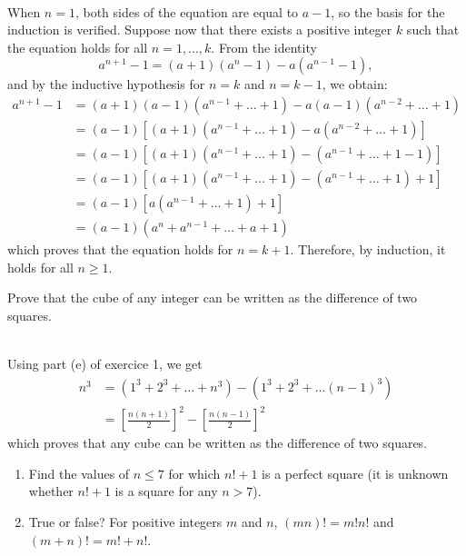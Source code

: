 \begin{solution}
    \\ When $n = 1$, both sides of the equation are equal to $a - 1$, so the basis for the induction is verified. Suppose now that there exists a positive integer $k$ such that the equation holds for all $n = 1, ..., k$. From the identity
    $$a^{n+1} - 1 = (a+1)(a^n - 1) - a(a^{n-1} - 1),$$ 
    and by the inductive hypothesis for $n = k$ and $n = k-1$, we obtain:
    \begin{align*}
        a^{n+1} - 1 &= (a+1)(a-1)(a^{n-1} + \dots + 1) -a(a-1)(a^{n-2} + \dots + 1) \\
        &= (a-1)[(a+1)(a^{n-1} + \dots + 1) -a(a^{n-2} + \dots + 1)] \\
        &= (a-1)[(a+1)(a^{n-1} + \dots + 1) -(a^{n-1} + \dots + 1 - 1)] \\
        &= (a-1)[(a+1)(a^{n-1} + \dots + 1) -(a^{n-1} + \dots + 1) + 1] \\
        &= (a-1)[a(a^{n-1} + \dots + 1) + 1] \\
        &= (a-1)(a^n + a^{n-1} + \dots + a + 1)
    \end{align*}
    which proves that the equation holds for $n = k+1$. Therefore, by induction, it holds for all $n \geq 1$. \\
\end{solution}

\begin{exercise}
    Prove that the cube of any integer can be written as the difference of two squares. \\
\end{exercise}

\begin{solution}
    \\ Using part (e) of exercice 1, we get
    \begin{align*}
        n^3 &= (1^3 + 2^3 + \dots + n^3) - (1^3 + 2^3 + \dots (n-1)^3) \\
        &= \left[\frac{n(n+1)}{2}\right]^2 - \left[\frac{n(n-1)}{2}\right]^2
    \end{align*}
    which proves that any cube can be written as the difference of two squares. \\
\end{solution}

\begin{exercise}
    \begin{enumerate}
        \item Find the values of $n \leq 7$ for which $n! + 1$ is a perfect square (it is unknown whether $n! + 1$ is a square for any $n > 7$).
        \item True or false? For positive integers $m$ and $n$, $(mn)! = m!n!$ and $(m+n)! = m! + n!$. \\
    \end{enumerate}
\end{exercise}

